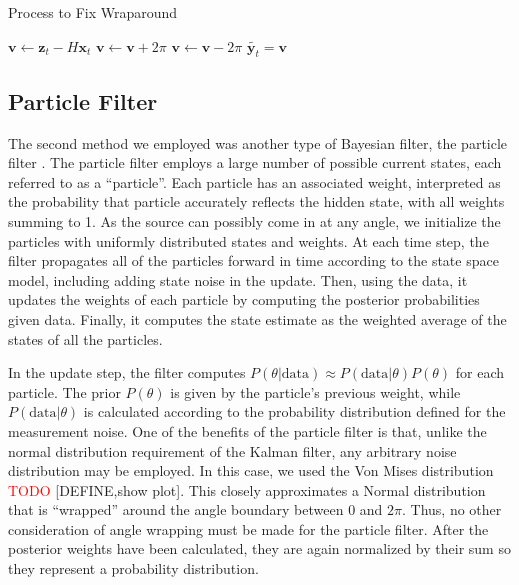 \documentclass[11pt]{amsart}
\begin{document}
\begin{algorithm}
    \caption{Process to Fix Wraparound}\label{alg:kalman}    
    \begin{algorithmic}
        \State $\mathbf{v} \gets \mathbf{z}_t - H\mathbf{x}_t$
            \State $\mathbf{v} \gets \mathbf{v} + 2\pi$
            \State $\mathbf{v} \gets \mathbf{v} - 2\pi$
        \EndIf 
        \State $\tilde{\mathbf{y}_t} = \mathbf{v}$ 
        \end{algorithmic}
    \end{algorithm}


\subsection{Particle Filter}
The second method we employed was another type of Bayesian filter, the particle filter \cite{Particle}. The particle filter employs a large number of possible current states, each referred to 
as a “particle”. Each particle has an associated weight, interpreted as the probability that particle accurately reflects the hidden state, with all weights summing to 1. As the source can possibly 
come in at any angle, we initialize the particles with uniformly distributed states and weights. At each time step, the filter propagates all of the particles forward in time according to the state space 
model, including adding state noise in the update. Then, using the data, it updates the weights of each particle by computing the posterior probabilities given data. Finally, it computes the state estimate 
as the weighted average of the states of all the particles. 

In the update step, the filter computes $P(\theta|\text{data}) \approx P(\text{data}|\theta)P(\theta)$ for each particle. The prior $P(\theta)$ is given by the particle’s previous weight, while $P(\text{data}|\theta)$ is calculated 
according to the probability distribution defined for the measurement noise. One of the benefits of the particle filter is that, unlike the normal distribution requirement of the Kalman filter, any arbitrary noise 
distribution may be employed. In this case, we used the Von Mises distribution \textcolor{red}{TODO} [DEFINE,show plot]. This closely approximates a Normal distribution that is “wrapped” around the angle boundary between $0$ and $2\pi$. 
Thus, no other consideration of angle wrapping must be made for the particle filter. After the posterior weights have been calculated, they are again normalized by their sum so they represent a probability distribution.
\end{document}
